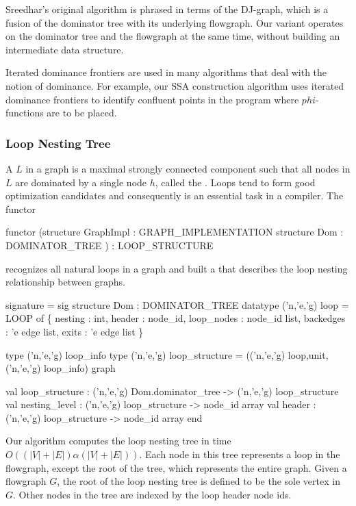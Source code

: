 Sreedhar's original algorithm is phrased in terms of the
DJ-graph, which is a fusion of the dominator tree
with its underlying flowgraph.  Our variant operates on the
dominator tree and the flowgraph at the same time, without
building an intermediate data structure.  

Iterated dominance frontiers are used
in many algorithms that deal with the notion of dominance.
For example, our SSA construction algorithm uses iterated
dominance frontiers to identify confluent points in the program
where $phi$-functions are to be placed.

\subsubsection{Loop Nesting Tree}

A  $L$ in a graph is a maximal 
strongly connected component 
such that all nodes in $L$ are dominated by a single node $h$, called
the .  Loops tend to form good optimization candidates
and consequently  is an essential task in a compiler.
The functor 
\begin{SML}
 functor  
  (structure GraphImpl : GRAPH_IMPLEMENTATION
   structure Dom       : DOMINATOR_TREE
  ) : LOOP_STRUCTURE 
\end{SML}
recognizes all natural loops in a graph and built a 
that describes the loop nesting relationship between graphs.

\begin{SML}
 signature  = sig
   structure Dom : DOMINATOR_TREE
   datatype ('n,'e,'g) loop =
      LOOP of \{ nesting    : int,
                header     : node_id,
                loop_nodes : node_id list,
                backedges  : 'e edge list,
                exits      : 'e edge list
              \}

   type ('n,'e,'g) loop_info
   type ('n,'e,'g) loop_structure = (('n,'e,'g) loop,unit, ('n,'e,'g) loop_info) graph

   val loop_structure : ('n,'e,'g) Dom.dominator_tree -> ('n,'e,'g) loop_structure
   val nesting_level : ('n,'e,'g) loop_structure -> node_id array
   val header        : ('n,'e,'g) loop_structure -> node_id array
 end
\end{SML}

Our algorithm computes the loop nesting tree in time 
$O((|V|+|E|)\alpha(|V|+|E|))$.
Each node in this tree represents a loop in the flowgraph, except the
root of the tree, which represents the entire graph.    
Given a flowgraph $G$, the root
of the loop nesting tree is defined to be the sole vertex in 
 $G$.  Other nodes in the tree
are indexed by the loop header node ids.

